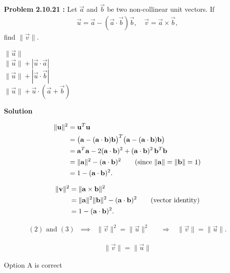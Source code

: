 \documentclass[12pt]{article}
\begin{document}
\noindent\textbf{Problem 2.10.21 :}  
Let $\vec{a}$ and $\vec{b}$ be two non-collinear unit vectors. If  
\begin{align}
\vec{u} = \vec{a} - (\vec{a}\cdot \vec{b})\vec{b}, 
\quad 
\vec{v} = \vec{a} \times \vec{b},
\end{align}
find $\|\vec{v}\|$.


\; $\|\vec{u}\|$ \\
\; $\|\vec{u}\| + |\vec{u}\cdot \vec{a}|$ \\
\; $\|\vec{u}\| + |\vec{u}\cdot \vec{b}|$ \\
\; $\|\vec{u}\| + \vec{u}\cdot(\vec{a}+\vec{b})$



\textbf{Solution}

\begin{align}
\|\vec{u}\|^2 
&= \vec{u}^T \vec{u} \notag \\
&= \big(\vec{a} - (\vec{a}\cdot\vec{b})\vec{b}\big)^T 
   \big(\vec{a} - (\vec{a}\cdot\vec{b})\vec{b}\big) \notag \\
&= \vec{a}^T\vec{a} - 2(\vec{a}\cdot\vec{b})^2 + (\vec{a}\cdot\vec{b})^2 \,\vec{b}^T\vec{b} \notag \\
&= \|\vec{a}\|^2 - (\vec{a}\cdot\vec{b})^2 
   \qquad (\text{since }\|\vec{a}\|=\|\vec{b}\|=1) \notag \\
&= 1 - (\vec{a}\cdot\vec{b})^2.
\end{align}

\begin{align}
\|\vec{v}\|^2 
&= \|\vec{a}\times\vec{b}\|^2 \notag \\
&= \|\vec{a}\|^2 \|\vec{b}\|^2 - (\vec{a}\cdot\vec{b})^2 
   \qquad (\text{vector identity}) \notag \\
&= 1 - (\vec{a}\cdot\vec{b})^2. 
\end{align}

\begin{align}
(2) \text{ and } (3) \;\;\implies\;\;
\|\vec{v}\|^2 = \|\vec{u}\|^2 
&\;\;\;\Rightarrow\;\;\; 
\|\vec{v}\| = \|\vec{u}\|.
\end{align}

\begin{align}
\boxed{\|\vec{v}\| = \|\vec{u}\|}
\end{align}

Option A is correct
\end{document}
